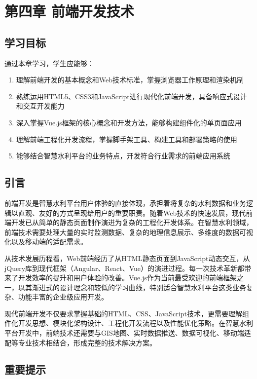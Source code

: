 \chapter{第四章 前端开发技术}

\section{学习目标}

通过本章学习，学生应能够：

\begin{enumerate}
\def\labelenumi{\arabic{enumi}.}
\tightlist
\item
  理解前端开发的基本概念和Web技术标准，掌握浏览器工作原理和渲染机制
\item
  熟练运用HTML5、CSS3和JavaScript进行现代化前端开发，具备响应式设计和交互开发能力
\item
  深入掌握Vue.js框架的核心概念和开发方法，能够构建组件化的单页面应用
\item
  理解前端工程化开发流程，掌握脚手架工具、构建工具和部署策略的使用
\item
  能够结合智慧水利平台的业务特点，开发符合行业需求的前端应用系统
\end{enumerate}

\section{引言}

前端开发是智慧水利平台用户体验的直接体现，承担着将复杂的水利数据和业务逻辑以直观、友好的方式呈现给用户的重要职责。随着Web技术的快速发展，现代前端开发已从简单的静态页面制作演进为复杂的工程化开发体系。在智慧水利领域，前端技术需要处理大量的实时监测数据、复杂的地理信息展示、多维度的数据可视化以及移动端的适配需求。

从技术发展历程看，Web前端经历了从HTML静态页面到JavaScript动态交互，从jQuery库到现代框架（Angular、React、Vue）的演进过程。每一次技术革新都带来了开发效率的提升和用户体验的改善。Vue.js作为当前最受欢迎的前端框架之一，以其渐进式的设计理念和较低的学习曲线，特别适合智慧水利平台这类业务复杂、功能丰富的企业级应用开发。

现代前端开发不仅要求掌握基础的HTML、CSS、JavaScript技术，更需要理解组件化开发思想、模块化架构设计、工程化开发流程以及性能优化策略。在智慧水利平台开发中，前端技术还需要与GIS地图、实时数据推送、数据可视化、移动端适配等专业技术相结合，形成完整的技术解决方案。

\section{重要提示}

